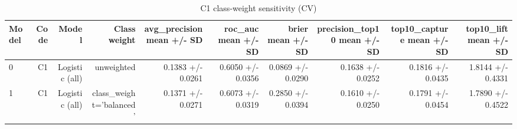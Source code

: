 \begin{table}[htbp]
\centering
\small
\caption{C1 class-weight sensitivity (CV)}
\begin{tabular}{lrrrrrrrrr}
\toprule
Model & Code & Model & Class weight & avg\_precision mean +/- SD & roc\_auc mean +/- SD & brier mean +/- SD & precision\_top10 mean +/- SD & top10\_capture mean +/- SD & top10\_lift mean +/- SD \\
\midrule
0 & C1 & Logistic (all) & unweighted & 0.1383 +/- 0.0261 & 0.6050 +/- 0.0356 & 0.0869 +/- 0.0290 & 0.1638 +/- 0.0252 & 0.1816 +/- 0.0435 & 1.8144 +/- 0.4331 \\
1 & C1 & Logistic (all) & class\_weight='balanced' & 0.1371 +/- 0.0271 & 0.6073 +/- 0.0319 & 0.2850 +/- 0.0394 & 0.1610 +/- 0.0250 & 0.1791 +/- 0.0454 & 1.7890 +/- 0.4522 \\
\bottomrule
\end{tabular}
\par\smallskip\begin{minipage}{\linewidth}\footnotesize \end{minipage}
\end{table}


